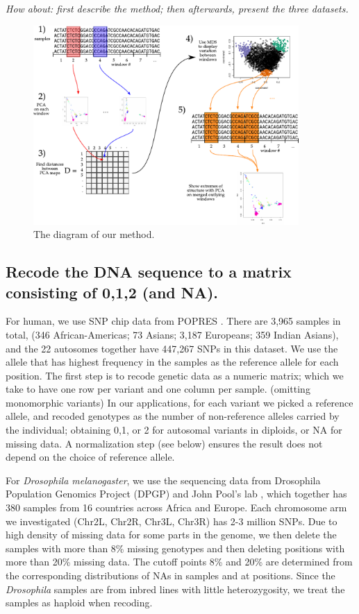 \documentclass[11pt, oneside]{article}   	%
\newcommand{\plr}[1]{{\em \color{blue} #1}}
\begin{document}
\plr{How about: first describe the method; then afterwards, present the three datasets.}
\begin{figure}
    \begin{center}
       \includegraphics[width=0.9\textwidth]{the-method-diagram}
    \end{center}
    \caption{
         The diagram of our method.
         \label{fig:diagram}
    }
\end{figure}



\subsection{Recode the DNA sequence to a matrix consisting of 0,1,2 (and NA).}

For human, we use SNP chip data from POPRES \citep{nelson2008population}. There are 3,965 samples in total, (346 African-Americas; 73 Asians; 3,187 Europeans; 359 Indian Asians), and the 22 autosomes together have 447,267 SNPs in this dataset. 
We use the allele that has highest frequency in the samples as the reference allele for each position. 
The first step is to recode genetic data as a numeric matrix; 
which we take to have one row per variant and one column per sample. (omitting monomorphic variants)
In our applications, for each variant we picked a reference allele, 
and recoded genotypes as the number of non-reference alleles carried by the individual;
obtaining 0,1, or 2 for autosomal variants in diploids, or NA for missing data.
A normalization step (see below) ensures the result does not depend on the choice of reference allele.

For \textit{Drosophila melanogaster}, we use the sequencing data from Drosophila Population Genomics Project (DPGP) and John Pool's lab \citep{lack2015drosophila}, 
which together has 380 samples from 16 countries across Africa and Europe.
Each chromosome arm we investigated (Chr2L, Chr2R, Chr3L, Chr3R) has 2-3 million SNPs.
Due to high density of missing data for some parts in the genome, we then delete the samples with more than 8\% missing genotypes and then deleting positions with more than 20\% missing data. 
The cutoff points 8\% and 20\% are determined from the corresponding distributions of NAs in samples and at positions. 
Since the \textit{Drosophila} samples are from inbred lines with little heterozygosity, we treat the samples as haploid when recoding.
\end{document}
